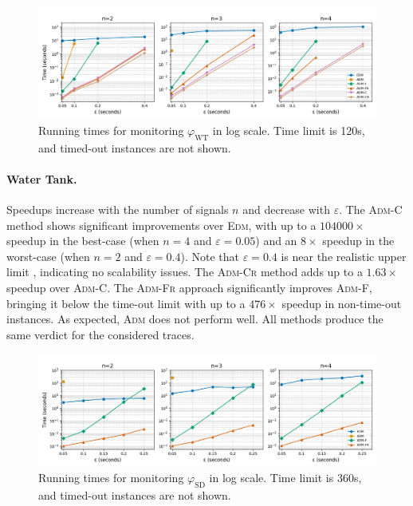 \begin{figure}[t]
	\begin{center}
		\includegraphics[width=\linewidth]{wt_newnames.png}
		\caption{Running times for monitoring $\varphi_{\text{WT}}$ in log scale. Time limit is 120s, and timed-out instances are not shown.}
	\end{center}
\end{figure}

\paragraph*{Water Tank.}
Speedups increase with the number of signals \(n\) and decrease with \(\varepsilon\).
The \textsc{Adm-C} method shows significant improvements over \textsc{Edm}, with up to a $104000\times$ speedup in the best-case (when \(n=4\) and \(\varepsilon=0.05\)) and an $8\times$ speedup in the worst-case (when \(n=2\) and \(\varepsilon=0.4\)).
Note that \(\varepsilon=0.4\) is near the realistic upper limit \cite{MomtazAB23}, indicating no scalability issues.
The \textsc{Adm-Cr} method adds up to a $1.63\times$ speedup over \textsc{Adm-C}.
The \textsc{Adm-Fr} approach significantly improves \textsc{Adm-F}, bringing it below the time-out limit with up to a $476\times$ speedup in non-time-out instances.
As expected, \textsc{Adm} does not perform well.
All methods produce the same verdict for the considered traces.

\begin{figure}[t]
	\begin{center}
		\includegraphics[width=\linewidth]{ms_newnames.png}
		\caption{Running times for monitoring $\varphi_{\text{SD}}$ in log scale. Time limit is 360s, and timed-out instances are not shown.}
	\end{center}
\end{figure}


